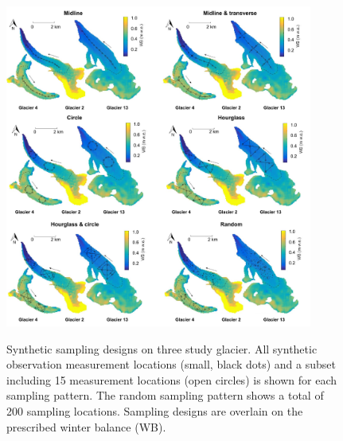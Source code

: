 \documentclass[twocolumn,letterpaper]{igs}
\begin{document}
\begin{figure}
	\centering
	\includegraphics[width =0.9\textwidth]{SamplingDesignAll.pdf}\\
	\caption{Synthetic sampling designs on three study glacier. All synthetic observation measurement locations (small, black dots) and a subset including 15 measurement locations (open circles) is shown for each sampling pattern. The random sampling pattern shows a total of 200 sampling locations. Sampling designs are overlain on the prescribed winter balance (WB). } 
       \label{fig:SyntheticSampleDesign}
\end{figure}
\end{document}
